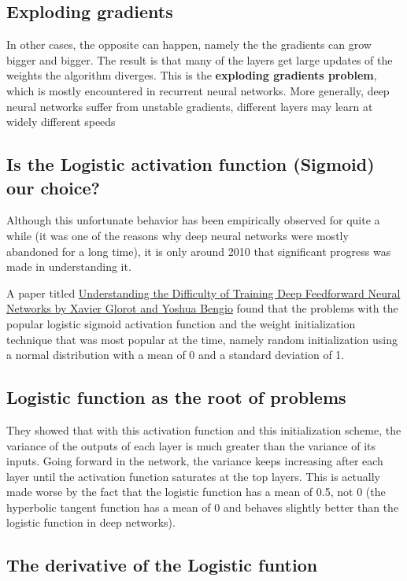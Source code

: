 \documentclass[%
oneside,                 %
final,                   %
10pt]{article}
\begin{document}
\subsection{Exploding gradients}

In other cases, the opposite can happen, namely the the gradients can
grow bigger and bigger. The result is that many of the layers get
large updates of the weights the algorithm diverges. This is the
\textbf{exploding gradients problem}, which is mostly encountered in
recurrent neural networks. More generally, deep neural networks suffer
from unstable gradients, different layers may learn at widely
different speeds

\subsection{Is the Logistic activation function (Sigmoid)  our choice?}

Although this unfortunate behavior has been empirically observed for
quite a while (it was one of the reasons why deep neural networks were
mostly abandoned for a long time), it is only around 2010 that
significant progress was made in understanding it.

A paper titled \href{{http://proceedings.mlr.press/v9/glorot10a.html}}{Understanding the Difficulty of Training Deep
Feedforward Neural Networks by Xavier Glorot and Yoshua Bengio} found that
the problems with the popular logistic
sigmoid activation function and the weight initialization technique
that was most popular at the time, namely random initialization using
a normal distribution with a mean of 0 and a standard deviation of
1. 

\subsection{Logistic function as the root of problems}

They showed that with this activation function and this
initialization scheme, the variance of the outputs of each layer is
much greater than the variance of its inputs. Going forward in the
network, the variance keeps increasing after each layer until the
activation function saturates at the top layers. This is actually made
worse by the fact that the logistic function has a mean of 0.5, not 0
(the hyperbolic tangent function has a mean of 0 and behaves slightly
better than the logistic function in deep networks).

\subsection{The derivative of the Logistic funtion}
\end{document}
